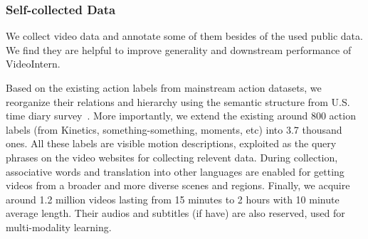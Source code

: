 \subsubsection{Self-collected Data}
We collect video data and annotate some of them besides of the used public data. We find they are helpful to improve generality and downstream performance of VideoIntern.

Based on the existing action labels from mainstream action datasets, we reorganize their relations and hierarchy using the semantic structure from U.S. time diary survey~\cite{atus}. More importantly, we extend the existing around 800 action labels (from Kinetics, something-something, moments, etc) into 3.7 thousand ones. All these labels are visible motion descriptions, exploited as the query phrases on the video websites for collecting relevent data. During collection, associative words and translation into other languages are enabled for getting videos from a broader and more diverse scenes and regions. Finally, we acquire around 1.2 million videos lasting from 15 minutes to 2 hours with 10 minute average length. Their audios and subtitles (if have) are also reserved, used for multi-modality learning.


